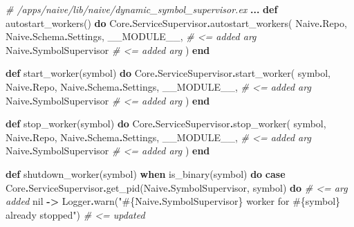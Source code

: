 \documentclass[
  oneside]{book}
\newenvironment{Shaded}{\begin{snugshade}}{\end{snugshade}}
\newcommand{\CommentTok}[1]{\textcolor[rgb]{0.56,0.35,0.01}{\textit{#1}}}
\newcommand{\ConstantTok}[1]{\textcolor[rgb]{0.00,0.00,0.00}{#1}}
\newcommand{\KeywordTok}[1]{\textcolor[rgb]{0.13,0.29,0.53}{\textbf{#1}}}
\newcommand{\NormalTok}[1]{#1}
\newcommand{\OperatorTok}[1]{\textcolor[rgb]{0.81,0.36,0.00}{\textbf{#1}}}
\newcommand{\OtherTok}[1]{\textcolor[rgb]{0.56,0.35,0.01}{#1}}
\newcommand{\StringTok}[1]{\textcolor[rgb]{0.31,0.60,0.02}{#1}}
\begin{document}
\begin{Shaded}
\begin{Highlighting}[]
  \CommentTok{\# /apps/naive/lib/naive/dynamic\_symbol\_supervisor.ex}
  \OperatorTok{...}
  \KeywordTok{def}\NormalTok{ autostart\_workers() }\KeywordTok{do}
    \ConstantTok{Core}\OperatorTok{.}\ConstantTok{ServiceSupervisor}\OperatorTok{.}\NormalTok{autostart\_workers(}
      \ConstantTok{Naive}\OperatorTok{.}\ConstantTok{Repo}\NormalTok{,}
      \ConstantTok{Naive}\OperatorTok{.}\ConstantTok{Schema}\OperatorTok{.}\ConstantTok{Settings}\NormalTok{,}
      \ConstantTok{\_\_MODULE\_\_}\NormalTok{,             }\CommentTok{\# \textless{}= added arg}
      \ConstantTok{Naive}\OperatorTok{.}\ConstantTok{SymbolSupervisor}  \CommentTok{\# \textless{}= added arg}
\NormalTok{    )}
  \KeywordTok{end}

  \KeywordTok{def}\NormalTok{ start\_worker(symbol) }\KeywordTok{do}
    \ConstantTok{Core}\OperatorTok{.}\ConstantTok{ServiceSupervisor}\OperatorTok{.}\NormalTok{start\_worker(}
\NormalTok{      symbol,}
      \ConstantTok{Naive}\OperatorTok{.}\ConstantTok{Repo}\NormalTok{,}
      \ConstantTok{Naive}\OperatorTok{.}\ConstantTok{Schema}\OperatorTok{.}\ConstantTok{Settings}\NormalTok{,}
      \ConstantTok{\_\_MODULE\_\_}\NormalTok{,             }\CommentTok{\# \textless{}= added arg}
      \ConstantTok{Naive}\OperatorTok{.}\ConstantTok{SymbolSupervisor}  \CommentTok{\# \textless{}= added arg}
\NormalTok{    )}
  \KeywordTok{end}

  \KeywordTok{def}\NormalTok{ stop\_worker(symbol) }\KeywordTok{do}
    \ConstantTok{Core}\OperatorTok{.}\ConstantTok{ServiceSupervisor}\OperatorTok{.}\NormalTok{stop\_worker(}
\NormalTok{      symbol,}
      \ConstantTok{Naive}\OperatorTok{.}\ConstantTok{Repo}\NormalTok{,}
      \ConstantTok{Naive}\OperatorTok{.}\ConstantTok{Schema}\OperatorTok{.}\ConstantTok{Settings}\NormalTok{,}
      \ConstantTok{\_\_MODULE\_\_}\NormalTok{,             }\CommentTok{\# \textless{}= added arg}
      \ConstantTok{Naive}\OperatorTok{.}\ConstantTok{SymbolSupervisor}  \CommentTok{\# \textless{}= added arg}
\NormalTok{    )}
  \KeywordTok{end}

  \KeywordTok{def}\NormalTok{ shutdown\_worker(symbol) }\KeywordTok{when}\NormalTok{ is\_binary(symbol) }\KeywordTok{do}
    \KeywordTok{case} \ConstantTok{Core}\OperatorTok{.}\ConstantTok{ServiceSupervisor}\OperatorTok{.}\NormalTok{get\_pid(}\ConstantTok{Naive}\OperatorTok{.}\ConstantTok{SymbolSupervisor}\NormalTok{, symbol) }\KeywordTok{do} \CommentTok{\# \textless{}= arg added}
      \ConstantTok{nil} \OperatorTok{{-}\textgreater{}}
        \ConstantTok{Logger}\OperatorTok{.}\NormalTok{warn(}\StringTok{"}\OtherTok{\#\{}\ConstantTok{Naive}\OperatorTok{.}\ConstantTok{SymbolSupervisor}\OtherTok{\}}\StringTok{ worker for }\OtherTok{\#\{}\NormalTok{symbol}\OtherTok{\}}\StringTok{ already stopped"}\NormalTok{) }\CommentTok{\# \textless{}= updated}


\end{Highlighting}
\end{Shaded}
\end{document}
